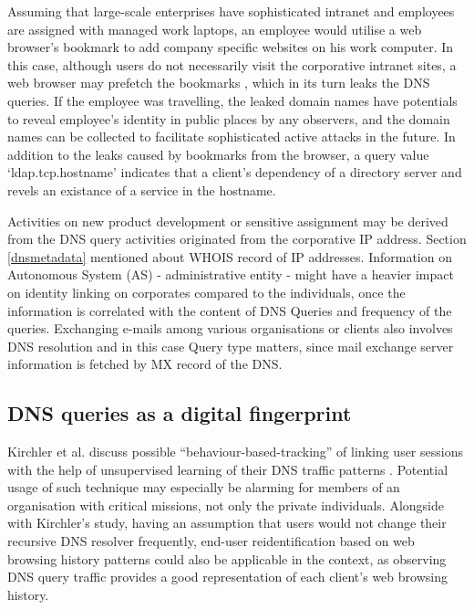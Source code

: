 Assuming that large-scale enterprises have sophisticated intranet and employees are assigned with managed work laptops, an employee would utilise a web browser's bookmark to add company specific websites on his work computer.
In this case, although users do not necessarily visit the corporative intranet sites, a web browser may prefetch the bookmarks \cite{firefox-autocomplete-url, chrome-dns-prefectching}, which in its turn leaks the DNS queries.
If the employee was travelling, the leaked domain names have potentials to reveal employee's identity in public places by any observers, and the domain names can be collected to facilitate sophisticated active attacks in the future.
In addition to the leaks caused by bookmarks from the browser, a query value `\textunderscore ldap.\textunderscore tcp.hostname' indicates that a client's dependency of a directory server \cite{Shulman:2014} and revels an existance of a service in the hostname.

Activities on new product development or sensitive assignment may be derived from the DNS query activities originated from the corporative IP address. Section \ref{dnsmetadata} mentioned about WHOIS record of IP addresses. Information on Autonomous System (AS) - administrative entity - might have a heavier impact on identity linking on corporates compared to the individuals, once the information is correlated with the content of DNS Queries and frequency of the queries. Exchanging e-mails among various organisations or clients also involves DNS resolution and in this case Query type matters, since mail exchange server information is fetched by MX record of the DNS.

\subsection{DNS queries as a digital fingerprint}
Kirchler et al. discuss possible ``behaviour-based-tracking'' of linking user sessions with the help of unsupervised learning of their DNS traffic patterns \cite{kirchler2016tracked}. Potential usage of such technique may especially be alarming for members of an organisation with critical missions, not only the private individuals.
Alongside with Kirchler's study, having an assumption that users would not change their recursive DNS resolver frequently, end-user reidentification based on web browsing history patterns \cite{olejnik2012johnny} could also be applicable in the context, as observing DNS query traffic provides a good representation of each client's web browsing history.
